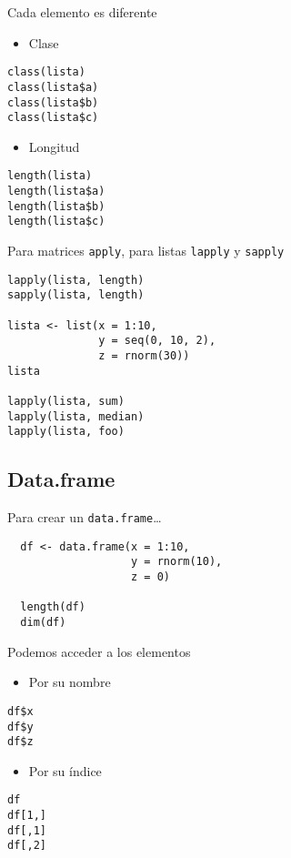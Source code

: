 \documentclass[xcolor={usenames,svgnames,dvipsnames}]{beamer}
\begin{document}
\begin{frame}[fragile,label=sec-4-1-3]{Cada elemento es diferente}
 \begin{itemize}
\item Clase
\end{itemize}
\lstset{language=R,label= ,caption= ,numbers=none}
\begin{lstlisting}
class(lista)
class(lista$a)
class(lista$b)
class(lista$c)
\end{lstlisting}
\begin{itemize}
\item Longitud
\end{itemize}
\lstset{language=R,label= ,caption= ,numbers=none}
\begin{lstlisting}
length(lista)
length(lista$a)
length(lista$b)
length(lista$c)
\end{lstlisting}
\end{frame}

\begin{frame}[fragile,label=sec-4-1-4]{Para matrices \texttt{apply}, para listas \texttt{lapply} y \texttt{sapply}}
 \lstset{language=R,label= ,caption= ,numbers=none}
\begin{lstlisting}
lapply(lista, length)
sapply(lista, length)

lista <- list(x = 1:10,
              y = seq(0, 10, 2),
              z = rnorm(30))
lista

lapply(lista, sum)
lapply(lista, median)
lapply(lista, foo)
\end{lstlisting}
\end{frame}


\subsection{Data.frame}
\label{sec-4-2}
\begin{frame}[fragile,label=sec-4-2-1]{Para crear un \texttt{data.frame}\ldots{}}
 \lstset{language=R,label= ,caption= ,numbers=none}
\begin{lstlisting}
  df <- data.frame(x = 1:10,
                   y = rnorm(10),
                   z = 0)
  
  length(df)
  dim(df)
\end{lstlisting}
\end{frame}
\begin{frame}[fragile,label=sec-4-2-2]{Podemos acceder a los elementos}
 \begin{itemize}
\item Por su nombre
\end{itemize}
\lstset{language=R,label= ,caption= ,numbers=none}
\begin{lstlisting}
df$x
df$y
df$z
\end{lstlisting}

\begin{itemize}
\item Por su índice
\end{itemize}
\lstset{language=R,label= ,caption= ,numbers=none}
\begin{lstlisting}
df
df[1,]
df[,1]
df[,2]
\end{lstlisting}
\end{frame}
\end{document}
